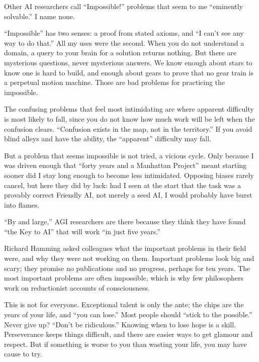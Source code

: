 Other AI researchers call ``Impossible!'' problems that seem to me ``eminently solvable.'' I name none. 

``Impossible'' has two senses: a proof from stated axioms, and ``I can't see any way to do that.'' All my uses were the second. When you do not understand a domain, a query to your brain for a solution returns nothing. But there are mysterious questions, never mysterious answers. We know enough about stars to know one is hard to build, and enough about gears to prove that no gear train is a perpetual motion machine. Those are bad problems for practicing the impossible.

The confusing problems that feel most intimidating are where apparent difficulty is most likely to fall, since you do not know how much work will be left when the confusion clears. ``Confusion exists in the map, not in the territory.'' If you avoid blind alleys and have the ability, the ``apparent'' difficulty may fall.

But a problem that seems impossible is not tried, a vicious cycle. Only because I was driven enough that ``forty years and a Manhattan Project'' meant starting sooner did I stay long enough to become less intimidated. Opposing biases rarely cancel, but here they did by luck: had I seen at the start that the task was a provably correct Friendly AI, not merely a seed AI, I would probably have burst into flames.

``By and large,'' AGI researchers are there because they think they have found ``the Key to AI'' that will work ``in just five years.'' 

Richard Hamming asked colleagues what the important problems in their field were, and why they were not working on them. Important problems look big and scary; they promise no publications and no progress, perhaps for ten years. The most important problems are often impossible, which is why few philosophers work on reductionist accounts of consciousness. 

This is not for everyone. Exceptional talent is only the ante; the chips are the years of your life, and ``you can lose.'' Most people should ``stick to the possible.'' Never give up? ``Don't be ridiculous.'' Knowing when to lose hope is a skill. Perseverance keeps things difficult, and there are easier ways to get glamour and respect. But if something is worse to you than wasting your life, you may have cause to try.

